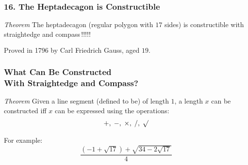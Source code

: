 \documentclass{beamer}
\begin{document}

%
%
%
%
%
%
%
%
%

\begin{frame}
\frametitle{16. The Heptadecagon is Constructible}

\vspace{-8ex}

\textit{Theorem}
The heptadecagon (regular polygon with $17$ sides) is constructible with straightedge and compass\,!!!!!

\bigskip\bigskip

Proved in 1796 by Carl Friedrich Gauss, aged $19$.

\end{frame}


\begin{frame}
\frametitle{What Can Be Constructed\\With Straightedge and Compass?}

\textit{Theorem} Given a line segment (defined to be) of length  $1$, a length $x$ can be constructed iff $x$ can be expressed using the operations:
\[
+,\; -,\; \times,\; /,\; \surd
\]

\bigskip

For example: 
\[
\frac{(-1+\sqrt{17}) + \sqrt{34-2\sqrt{17}}}{4}
\]
\end{frame}
\end{document}
